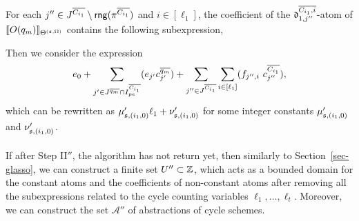 \begin{appendix}
For each $j'' \in J^{\overline{C_{i_1}}} \setminus \mathsf{rng}(\pi^{\overline{C_{i_1}}})$ and $i \in [\ell_1]$, the coefficient of the $\mathfrak{d}^{\overline{C_{i_1}, i}}_{1, j''}$-atom of $\llbracket O(q_m)\rrbracket_{\Theta^{({\mathfrak{s} },\Omega)}}$ contains the following subexpression, 
\begin{center}
\end{center}

Then we consider the expression 
\[e_0 + \sum \limits_{j' \in J^{\circled{q_m}} \cap I^{\circled{C_{i_1}}}_{pe}} (e_{j'} c^{\circled{q_m}}_{j'}) + \sum \limits_{j'' \in J^{\circled{C_{i_1}}} } \sum \limits_{i \in [\ell_1]} (f_{j'',i}\ c^{\circled{C_{i_1}}}_{j''}),\] 
which can be rewritten as $\mu'_{{\mathfrak{s} },(i_1,0)} \ell_1 + \nu'_{{\mathfrak{s} },(i_1,0)}$ for some integer constants $\mu'_{{\mathfrak{s} }, (i_1,0)}$ and $\nu'_{{\mathfrak{s} }, (i_1,0)}$. 
%
\medskip\\
\smallskip\\

If after Step II$''$, the algorithm has not return yet, then similarly to Section~\ref{sec-glasso}, we can construct a finite set $U'' \subset {\mathbb{Z} }$, which acts as a bounded domain for the constant atoms and the coefficients of non-constant atoms after removing all the subexpressions related to the cycle counting variables $\ell_1,\dots,\ell_t$. Moreover, we can construct the set $\mathscr{A''}$ of abstractions of cycle schemes.
%
\medskip\\
\smallskip\\


\end{appendix}
